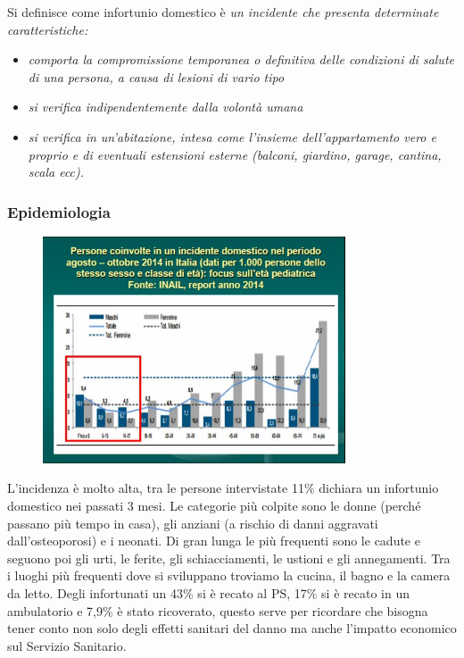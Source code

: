 Si definisce come infortunio domestico è \emph{un incidente che presenta
determinate caratteristiche:}

\begin{itemize}
\item \emph{comporta la compromissione temporanea o definitiva delle
condizioni di salute di una persona, a causa di lesioni di vario tipo}
\item \emph{si verifica indipendentemente dalla volontà umana}
\item \emph{si verifica in un'abitazione, intesa come l'insieme
dell'appartamento vero e proprio e di eventuali estensioni esterne
(balconi, giardino, garage, cantina, scala ecc).}
\end{itemize}

\subsubsection{Epidemiologia}

\begin{figure}[!ht]
\centering
	\includegraphics[width=0.8\textwidth]{28/image6.jpg}
	\end{figure}

L'incidenza è molto alta, tra le persone intervistate 11\% dichiara un
infortunio domestico nei passati 3 mesi. Le categorie più colpite sono
le donne (perché passano più tempo in casa), gli anziani (a rischio di
danni aggravati dall'osteoporosi) e i neonati. Di gran lunga le più
frequenti sono le cadute e seguono poi gli urti, le ferite, gli
schiacciamenti, le ustioni e gli annegamenti. Tra i luoghi più frequenti
dove si sviluppano troviamo la cucina, il bagno e la camera da letto.
Degli infortunati un 43\% si è recato al PS, 17\% si è recato in un
ambulatorio e 7,9\% è stato ricoverato, questo serve per ricordare che
bisogna tener conto non solo degli effetti sanitari del danno ma anche
l'impatto economico sul Servizio Sanitario.

